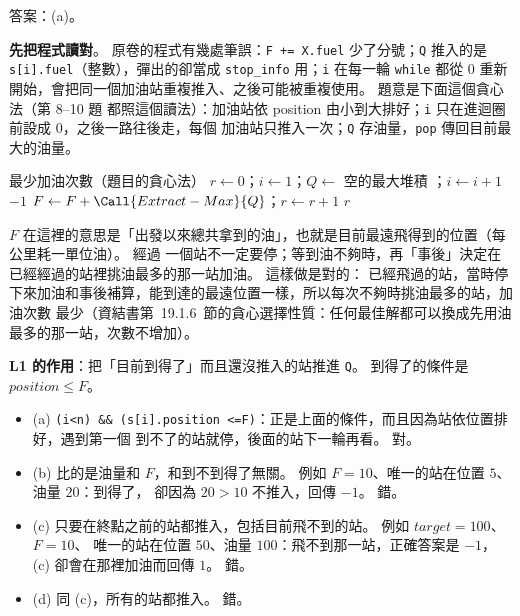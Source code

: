 \begin{pastsoln}
答案：(a)。

\textbf{先把程式讀對}。 原卷的程式有幾處筆誤：\texttt{F += X.fuel} 少了分號；\texttt{Q} 推入的是
\texttt{s[i].fuel}（整數），彈出的卻當成 \texttt{stop\_info} 用；\texttt{i} 在每一輪 \texttt{while}
都從 $0$ 重新開始，會把同一個加油站重複推入、之後可能被重複使用。 題意是下面這個貪心法（第 8--10 題
都照這個讀法）：加油站依 position 由小到大排好；\texttt{i} 只在進迴圈前設成 $0$，之後一路往後走，每個
加油站只推入一次；\texttt{Q} 存油量，\texttt{pop} 傳回目前最大的油量。
\begin{pseudo}{最少加油次數（題目的貪心法）}
    \State $r \gets 0$；$i \gets 1$；$Q \gets$ 空的最大堆積
         
            \State {}；$i \gets i + 1$
        \EndWhile
            \State \Return $-1$ 
        \EndIf
        \State $F \gets F + \Call{Extract-Max}{Q}$；$r \gets r + 1$
    \EndWhile
    \State \Return $r$
\EndFunction
\end{pseudo}
$F$ 在這裡的意思是「出發以來總共拿到的油」，也就是目前最遠飛得到的位置（每公里耗一單位油）。 經過
一個站不一定要停；等到油不夠時，再「事後」決定在已經經過的站裡挑油最多的那一站加油。 這樣做是對的：
已經飛過的站，當時停下來加油和事後補算，能到達的最遠位置一樣，所以每次不夠時挑油最多的站，加油次數
最少（資結書第~19.1.6~節的貪心選擇性質：任何最佳解都可以換成先用油最多的那一站，次數不增加）。

\textbf{L1 的作用}：把「目前到得了」而且還沒推入的站推進 \texttt{Q}。 到得了的條件是
$\mathit{position} \le F$。
\begin{itemize}
\item (a) \texttt{(i<n) \&\& (s[i].position <=F)}：正是上面的條件，而且因為站依位置排好，遇到第一個
到不了的站就停，後面的站下一輪再看。 對。
\item (b) 比的是油量和 $F$，和到不到得了無關。 例如 $F = 10$、唯一的站在位置 $5$、油量 $20$：到得了，
卻因為 $20 > 10$ 不推入，回傳 $-1$。 錯。
\item (c) 只要在終點之前的站都推入，包括目前飛不到的站。 例如 $\mathit{target} = 100$、$F = 10$、
唯一的站在位置 $50$、油量 $100$：飛不到那一站，正確答案是 $-1$，(c) 卻會在那裡加油而回傳 $1$。 錯。
\item (d) 同 (c)，所有的站都推入。 錯。
\end{itemize}
\end{pastsoln}
